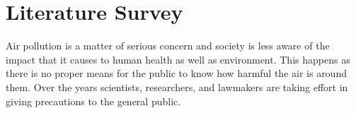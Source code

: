 \chapter{Literature Survey}

Air pollution is a matter of serious concern and society is less aware of the impact that it causes
to human health as well as environment. This happens as there is no proper means for the public to know how harmful the air is around them. Over the years scientists, researchers, and lawmakers are taking effort in giving precautions to the general public. 

